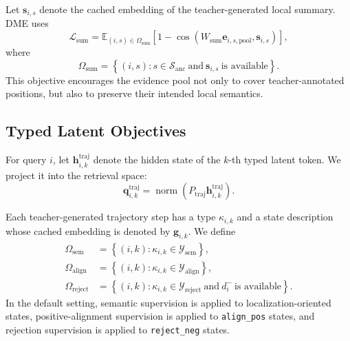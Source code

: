 Let $\mathbf{s}_{i,s}$ denote the cached embedding of the teacher-generated local summary. DME uses
\begin{equation}
    \mathcal{L}_{\mathrm{sum}}
    =
    \mathbb{E}_{
        (i,s)
        \in
        \Omega_{\mathrm{sum}}
    }
    \left[
        1
        -
        \cos
        \left(
            W_{\mathrm{sum}}
            \mathbf{e}_{i,s,\mathrm{pool}},
            \mathbf{s}_{i,s}
        \right)
    \right],
\label{eq:app-summary-loss}
\end{equation}
where
\begin{equation}
    \Omega_{\mathrm{sum}}
    =
    \left\{
        (i,s):
        s \in \mathcal{S}_{\mathrm{anc}}
        \ \text{and}\
        \mathbf{s}_{i,s}
        \ \text{is available}
    \right\}.
\end{equation}
This objective encourages the evidence pool not only to cover teacher-annotated positions, but also to preserve their intended local semantics.

\subsection{Typed Latent Objectives}
\label{app:typed-latent-objectives}

For query $i$, let $\mathbf{h}_{i,k}^{\mathrm{traj}}$ denote the hidden state of the $k$-th typed latent token. We project it into the retrieval space:
\begin{equation}
    \mathbf{q}_{i,k}^{\mathrm{traj}}
    =
    \operatorname{norm}
    \left(
        P_{\mathrm{traj}}
        \mathbf{h}_{i,k}^{\mathrm{traj}}
    \right).
\label{eq:app-trajectory-projection}
\end{equation}

Each teacher-generated trajectory step has a type $\kappa_{i,k}$ and a state description whose cached embedding is denoted by $\mathbf{g}_{i,k}$. We define
\begin{align}
    \Omega_{\mathrm{sem}}
    &=
    \left\{
        (i,k):
        \kappa_{i,k}
        \in
        \mathcal{Y}_{\mathrm{sem}}
    \right\},
    \\
    \Omega_{\mathrm{align}}
    &=
    \left\{
        (i,k):
        \kappa_{i,k}
        \in
        \mathcal{Y}_{\mathrm{align}}
    \right\},
    \\
    \Omega_{\mathrm{reject}}
    &=
    \left\{
        (i,k):
        \kappa_{i,k}
        \in
        \mathcal{Y}_{\mathrm{reject}}
        \ \text{and}\
        d_i^-
        \ \text{is available}
    \right\}.
\end{align}
In the default setting, semantic supervision is applied to localization-oriented states, positive-alignment supervision is applied to \texttt{align\_pos} states, and rejection supervision is applied to \texttt{reject\_neg} states.

